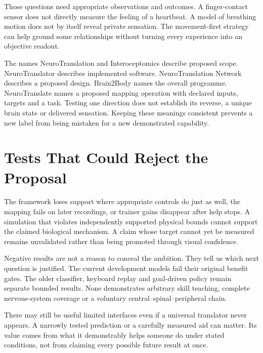 Those questions need appropriate observations and outcomes. A finger-contact sensor does not directly measure the feeling of a heartbeat. A model of breathing motion does not by itself reveal private sensation. The movement-first strategy can help ground some relationships without turning every experience into an objective readout.\par

The names NeuroTranslation and Interoceptomics describe proposed scope. NeuroTranslator describes implemented software. NeuroTranslation Network describes a proposed design. Brain2Body names the overall programme. NeuroTranslate names a proposed mapping operation with declared inputs, targets and a task. Testing one direction does not establish its reverse, a unique brain state or delivered sensation. Keeping these meanings consistent prevents a new label from being mistaken for a new demonstrated capability.\par

\section{Tests That Could Reject the Proposal}

The framework loses support where appropriate controls do just as well, the mapping fails on later recordings, or trainer gains disappear after help stops. A simulation that violates independently supported physical bounds cannot support the claimed biological mechanism. A claim whose target cannot yet be measured remains unvalidated rather than being promoted through visual confidence.\par

Negative results are not a reason to conceal the ambition. They tell us which next question is justified. The current development models fail their original benefit gates. The older classifier, keyboard replay and goal-driven policy remain separate bounded results. None demonstrates arbitrary skill teaching, complete nervous-system coverage or a voluntary central--spinal--peripheral chain.\par

There may still be useful limited interfaces even if a universal translator never appears. A narrowly tested prediction or a carefully measured aid can matter. Its value comes from what it demonstrably helps someone do under stated conditions, not from claiming every possible future result at once.\par

